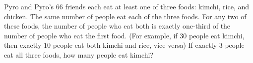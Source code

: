 Pyro and Pyro's $66$ friends each eat at least one of three foods: kimchi, rice, and chicken. The same number of people eat each of the three foods. For any two of these foods, the number of people who eat both is exactly one-third of the number of people who eat the first food. (For example, if $30$ people eat kimchi, then exactly $10$ people eat both kimchi and rice, vice versa) If exactly $3$ people eat all three foods, how many people eat kimchi?
